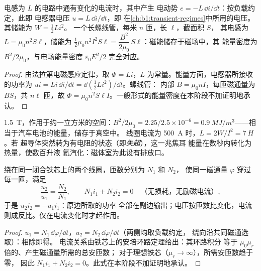 \begin{proposition}\label{prop:b1:induction:inductor}
电感为 $L$ 的电路中通有变化的电流时，其中产生
电动势 $e = -L\,\dd i/\dd t$：按负载约定，此即
电感器电压 $u = L\,\dd i/\dd t$，即
在\cref{ch:b1:transient-regimes}中所用的电压。其储能为 $W = \tfrac12Li^2$。
一个长螺线管，每米 $n$ 匝，长 $\ell$，截面积 $S$，
其电感为 $L = \mu_0n^2S\ell$，储能为 $\tfrac12\mu_0n^2I^2S\ell =
\dfrac{B^2}{2\mu_0}\,S\ell$：磁能储存于磁场中，其
能量密度为 $B^2/2\mu_0$，与电场能量密度 $\varepsilon_0E^2/2$ 完全对应。
\end{proposition}

\begin{proof}
由法拉第电磁感应定律，取 $\Phi = Li$，$L$ 为常量。能量方面，电感器所接收的功率为
$ui = Li\,\dd i/\dd t = \dd(\tfrac12Li^2)/\dd t$。螺线管：
内部 $B = \mu_0nI$，每匝磁通量为 $BS$，共 $n\ell$ 匝，故 $\Phi =
\mu_0n^2S\ell I$。一般形式的能量密度在本阶段不加证明地承认。
\end{proof}

\begin{example}[磁共振成像磁体]\label{ex:b1:induction:mri}
\qty{1.5}{T}，作用于约一立方米的空间：$B^2/2\mu_0 = 2.25/2.5 \times 10^{-6} =
\qty{0.9}{MJ/m^3}$——相当于汽车电池的能量，储存于真空中。
线圈电流为 \qty{500}{A} 时，$L = 2W/I^2 = \qty{7}{H}$。若
超导体突然转为有电阻的状态（即\emph{失超}），这一兆焦耳
能量在数秒内转化为热量，使数百升液
氦汽化：磁体室为此设有排放口。
\end{example}

\begin{proposition}[理想变压器]\label{prop:b1:induction:transformer}
绕在同一闭合铁芯上的两个线圈，匝数分别为 $N_1$ 和 $N_2$，
使同一磁通量 $\varphi$ 穿过每一匝，满足
\[
\frac{u_2}{u_1} = \frac{N_2}{N_1} , \qquad N_1i_1 + N_2i_2 = 0 \quad\text{（无损耗，无励磁电流）},
\]
于是 $u_2i_2 = -u_1i_1$：原边所取的功率
全部在副边输出；电压按匝数比变化，电流
则成反比。仅在电流变化时才起作用。
\end{proposition}

\begin{proof}
$u_1 = N_1\,\dd\varphi/\dd t$，$u_2 = N_2\,\dd\varphi/\dd t$（两侧均取负载约定，
绕向沿共同磁通选取）：相除即得。
电流关系由铁芯上的安培环路定理给出：其环路积分
等于 $\mu_0\mu_r$ 倍的、产生磁通量所需的总安匝数；
对于理想铁芯（$\mu_r \to \infty$），所需安匝数趋于零，
因此 $N_1i_1 + N_2i_2 = 0$。此式在本阶段不加证明地承认。
\end{proof}

